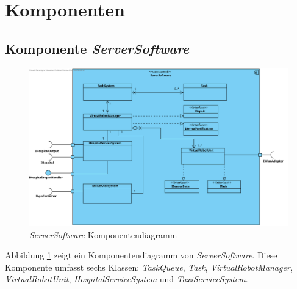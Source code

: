 \section{Komponenten}

\subsection{Komponente \textit{ServerSoftware}}
\begin{figure}[H]
\centering
\includegraphics[height=0.7\textwidth, angle=90]{img/2-Entwurf-5-ServerSoftware}
\caption{\emph{ServerSoftware}-Komponentendiagramm}
\label{KomponentenStruktur1}
\end{figure}
Abbildung \ref{KomponentenStruktur1} zeigt ein Komponentendiagramm von \emph{ServerSoftware}. 
Diese Komponente umfasst sechs Klassen: \textit{TaskQueue}, \textit{Task}, \textit{VirtualRobotManager}, \textit{VirtualRobotUnit}, \textit{HospitalServiceSystem} und \textit{TaxiServiceSystem}.

